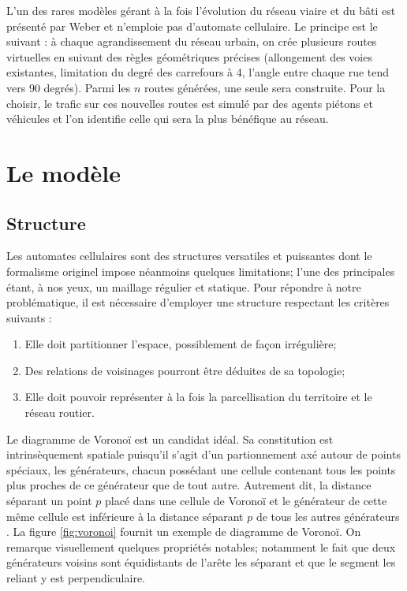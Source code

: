 \documentclass[12pt]{article}
\begin{document}
L'un des rares modèles gérant à la fois l'évolution du réseau viaire
et du bâti est présenté par Weber \cite{Weber2009} et n'emploie pas
d'automate cellulaire. Le principe est le suivant : à chaque
agrandissement du réseau urbain, on crée plusieurs routes virtuelles
en suivant des règles géométriques précises (allongement des voies
existantes, limitation du degré des carrefours à 4, l'angle entre
chaque rue tend vers 90 degrés). Parmi les $n$ routes générées, une
seule sera construite. Pour la choisir, le trafic sur ces nouvelles
routes est simulé par des agents piétons et véhicules et l'on
identifie celle qui sera la plus bénéfique au réseau.

\section{Le modèle}

\subsection{Structure}

Les automates cellulaires sont des structures versatiles et puissantes
dont le formalisme originel impose néanmoins quelques limitations;
l'une des principales étant, à nos yeux, un maillage régulier et
statique. Pour répondre à notre problématique, il est nécessaire
d'employer une structure respectant les critères suivants :

\begin{enumerate}
\item{Elle doit partitionner l'espace, possiblement de façon
  irrégulière;}
\item{Des relations de voisinages pourront être déduites de sa
  topologie;}
\item{Elle doit pouvoir représenter à la fois la parcellisation du
  territoire et le réseau routier.}
\end{enumerate}

Le diagramme de Voronoï est un candidat idéal. Sa constitution est
intrinsèquement spatiale puisqu'il s'agit d'un partionnement axé
autour de points spéciaux, les générateurs, chacun possédant une
cellule contenant tous les points plus proches de ce générateur que de
tout autre. Autrement dit, la distance séparant un point $p$ placé
dans une cellule de Voronoï et le générateur de cette même cellule est
inférieure à la distance séparant $p$ de tous les autres générateurs
\cite{Edwards1993}. La figure \ref{fig:voronoi} fournit un exemple de
diagramme de Voronoï. On remarque visuellement quelques propriétés
notables; notamment le fait que deux générateurs voisins sont
équidistants de l'arête les séparant et que le segment les reliant y
est perpendiculaire.
\end{document}
